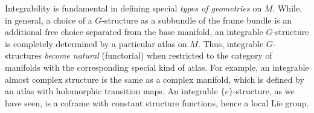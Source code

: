 \begin{intu*}
    Integrability is fundamental in defining special \emph{types of geometries} on $M$. While, in general, a choice of a $G$-structure as a subbundle of the frame bundle is an additional free choice separated from the base manifold, an integrable $G$-structure is completely determined by a particular atlas on $M$. Thus, integrable $G$-structures \emph{become natural} (functorial) when restricted to the category of manifolds with the corresponding special kind of atlas. For example, an integrable almost complex structure is the same as a complex manifold, which is defined by an atlas with holomorphic transition maps. An integrable $\{e\}$-structure, as we have seen, is a coframe with constant structure functions, hence a local Lie group.
\end{intu*}

